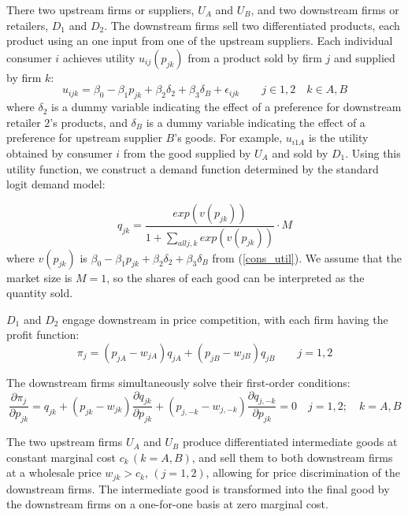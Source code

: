 \documentclass[12pt]{article}%
\begin{document}
There two upstream firms or suppliers, $U_A$ and $U_B$, and two downstream firms or retailers, $D_1$ and $D_2$. The downstream firms sell two differentiated products, each product using an one input from one of the upstream suppliers. Each individual consumer $i$ achieves utility $u_{ij}(p_{jk})$ from a product sold by firm $j$ and supplied by firm $k$:
\begin{equation} \label{cons_util}
    u_{ijk} = \beta_0 - \beta_1 p_{jk} + \beta_2 \delta_2 + \beta_3\delta_B + \epsilon_{ijk} \qquad j \in {1,2} \quad k \in {A, B}
\end{equation}
where $\delta_2$ is a dummy variable indicating the effect of a preference for downstream retailer $2$'s products, and $\delta_B$ is a dummy variable indicating the effect of a preference for upstream supplier $B$'s goods. For example, $u_{i1A}$ is the utility obtained by consumer $i$ from the good supplied by $U_A$ and sold by $D_1$. Using this utility function, we construct a demand function determined by the standard logit demand model: 

\begin{equation} \label{demand_eq}
    q_{jk} = \frac{exp(v(p_{jk}))}{1 + \sum_{all j,k} exp(v(p_{jk}))} \cdot M
\end{equation}
where $v(p_{jk})$ is $\beta_0 - \beta_1 p_{jk} + \beta_2 \delta_2 + \beta_3\delta_B$ from (\ref{cons_util}). We assume that the market size is $M = 1$, so the shares of each good can be interpreted as the quantity sold. 

$D_1$ and $D_2$ engage downstream in price competition, with each firm having the profit function:
\begin{equation}
    \pi_j = (p_{jA} - w_{jA})q_{jA} + (p_{jB} - w_{jB})q_{jB} \qquad j = 1,2     
\end{equation}

The downstream firms simultaneously solve their first-order conditions:
\begin{equation}
    \frac{\partial \pi_j}{\partial p_{jk}} = q_{jk} + (p_{jk} - w_{jk})\frac{\partial q_{jk}}{\partial p_{jk}} + (p_{j, -k} - w_{j, -k})\frac{\partial q_{j, -k}}{\partial p_{jk}} = 0 \quad j = 1,2; \quad k = A,B
\end{equation}

The two upstream firms $U_A$ and $U_B$ produce differentiated intermediate goods at constant marginal cost $c_k \, (k = A, B)$, and sell them to both downstream firms at a wholesale price $w_{jk} > c_k$, $(j = 1,2)$, allowing for price discrimination of the downstream firms. The intermediate good is transformed into the final good by the downstream firms on a one-for-one basis at zero marginal cost.
\end{document}
